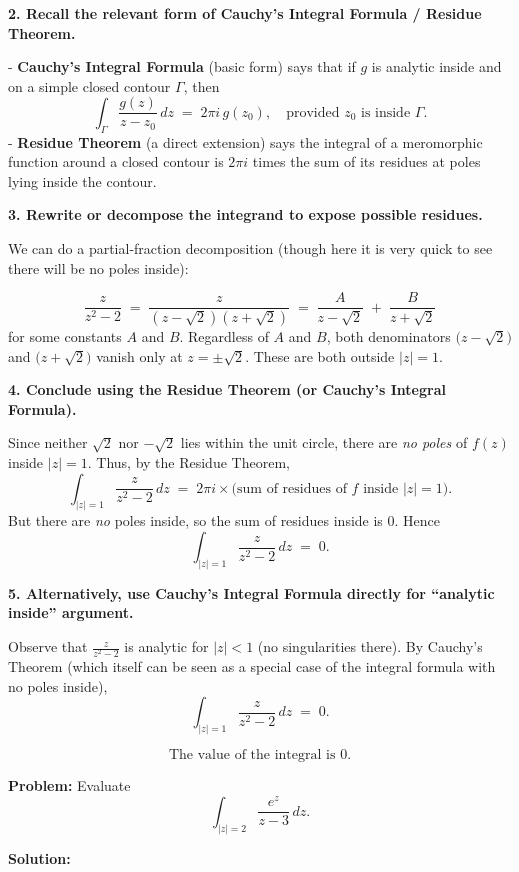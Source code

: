 \documentclass[12pt]{article}
\theoremstyle{definition} %
\theoremstyle{plain} %
\begin{document}
\textbf{2. Recall the relevant form of Cauchy’s Integral Formula / Residue Theorem.}

- \textbf{Cauchy's Integral Formula} (basic form) says that if \(g\) is analytic inside and on a simple closed contour \(\Gamma\), then
\[
\int_{\Gamma} \frac{g(z)}{z-z_0}\,dz 
\;=\;
2\pi i \,g(z_0),
\quad
\text{provided } z_0 \text{ is inside } \Gamma.
\]
- \textbf{Residue Theorem} (a direct extension) says the integral of a meromorphic function around a closed contour is \(2\pi i\) times the sum of its residues at poles lying inside the contour.

\textbf{3. Rewrite or decompose the integrand to expose possible residues.}

We can do a partial-fraction decomposition (though here it is very quick to see there will be no poles inside):

\[
\frac{z}{z^2 - 2}
\;=\;
\frac{z}{(z-\sqrt{2})(z+\sqrt{2})}
\;=\;
\frac{A}{z-\sqrt{2}} \;+\; \frac{B}{z+\sqrt{2}}
\]
for some constants \(A\) and \(B\). Regardless of \(A\) and \(B\), both denominators \(\bigl(z-\sqrt{2}\bigr)\) and \(\bigl(z+\sqrt{2}\bigr)\) vanish only at \(z=\pm\sqrt{2}\). These are both outside \(\lvert z\rvert=1\).

\textbf{4. Conclude using the Residue Theorem (or Cauchy’s Integral Formula).}

Since neither \(\sqrt{2}\) nor \(-\sqrt{2}\) lies within the unit circle, there are \emph{no poles} of \(f(z)\) inside \(\lvert z\rvert=1\). Thus, by the Residue Theorem,
\[
\int_{\lvert z\rvert=1} \frac{z}{z^2 - 2}\,dz
\;=\;
2\pi i \times \bigl(\text{sum of residues of }f \text{ inside }|z|=1\bigr).
\]
But there are \emph{no} poles inside, so the sum of residues inside is \(0\). Hence
\[
\int_{\lvert z\rvert=1} \frac{z}{z^2 - 2}\,dz 
\;=\;
0.
\]

\textbf{5. Alternatively, use Cauchy’s Integral Formula directly for ``analytic inside'' argument.}

Observe that \(\displaystyle \frac{z}{z^2 - 2}\) is analytic for \(\lvert z\rvert < 1\) (no singularities there). By Cauchy’s Theorem (which itself can be seen as a special case of the integral formula with no poles inside),
\[
\int_{\lvert z\rvert=1} \frac{z}{z^2 - 2}\,dz \;=\; 0.
\]

\[
\boxed{ \text{The value of the integral is } 0. }
\]

\textbf{Problem:} Evaluate
\[
\int_{\lvert z\rvert=2} \frac{e^z}{z-3}\,dz.
\]

\textbf{Solution:}
\end{document}
